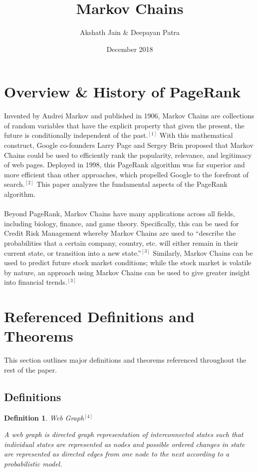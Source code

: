 \documentclass{article}
\title{Markov Chains}
\author{Akshath Jain \& Deepayan Patra}
\date{December 2018}
\newtheorem{definition}{Definition}
\begin{document}
\maketitle

\section{Overview \& History of PageRank}
Invented by Andrei Markov and published in 1906, Markov Chains are collections of random variables that have the explicit property that given the present, the future is conditionally independent of the past.$^{[1]}$ With this mathematical construct, Google co-founders Larry Page and Sergey Brin proposed that Markov Chains could be used to efficiently rank the popularity, relevance, and legitimacy of web pages. Deployed in 1998, this PageRank algorithm was far superior and more efficient than other approaches, which propelled Google to the forefront of search.$^{[2]}$ This paper analyzes the fundamental aspects of the PageRank algorithm. 
\\\\
Beyond PageRank, Markov Chains have many applications across all fields, including biology, finance, and game theory. Specifically, this can be used for Credit Risk Management whereby Markov Chains are used to ``describe the probabilities that a certain company, country, etc. will either remain in their current state, or transition into a new state.''$^{[3]}$ Similarly, Markov Chains can be used to predict future stock market conditions; while the stock market is volatile by nature, an approach using Markov Chains can be used to give greater insight into financial trends.$^{[3]}$

\section{Referenced Definitions and Theorems}
    This section outlines major definitions and theorems referenced throughout the rest of the paper.
    \subsection{Definitions}
    
    \begin{definition}{Web Graph$^{[4]}$}
    
    \noindent
    \textup{A web graph is directed graph representation of interconnected states such that individual states are represented as nodes and possible ordered changes in state are represented as directed edges from one node to the next according to a probabilistic model.}
    
    \end{definition}
    
\end{document}
